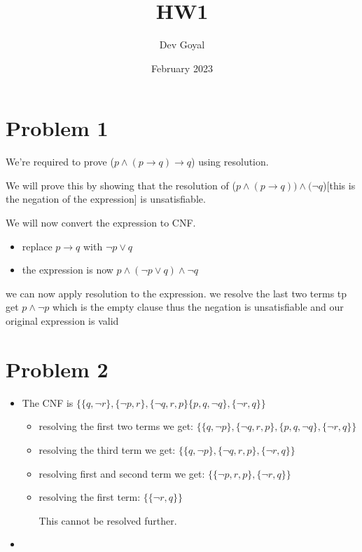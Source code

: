 \documentclass{article}
\title{HW1}
\author{Dev Goyal }
\date{February 2023}
\begin{document}
\maketitle

\section{Problem 1}

We're required to prove ($p \land (p \rightarrow q) \rightarrow q$) using resolution.

We will prove this by showing that the resolution of ($p \land (p \rightarrow q)) \land (\neg q$)[this is the negation of the expression] is unsatisfiable.

We will now convert the expression to CNF.

\begin{itemize}
    \item replace $p \rightarrow q $ with $\neg p \lor q$
    \item the expression is now $p \land (\neg p \lor q) \land \neg q$
\end{itemize}
we can now apply resolution to the expression. we resolve the last two terms tp get $p \land \neg p$ which is the empty clause thus the negation is unsatisfiable and our original expression is valid 

\section{Problem 2}
\begin{itemize}
    \item The CNF is $\{ \{ q, \neg r\}, \{ \neg p, r \},\{ \neg q, r, p\} \{p, q, \neg q \}, \{\neg r, q \}\}$
    \begin{itemize}
        \item resolving the first two terms we get: $\{ \{ q, \neg p\},\{ \neg q, r, p\}, \{p, q, \neg q \}, \{\neg r, q \} \} $
        \item resolving the third term we get: $\{ \{ q, \neg p\},\{ \neg q, r, p\}, \{\neg r, q \} \} $
        \item resolving first and second term we get: $\{ \{ \neg p, r, p\}, \{\neg r, q \} \} $
        \item resolving the first term: $\{ \{\neg r, q \} \} $
        
        This cannot be resolved further.
        
    \end{itemize}
    
    \item 
\end{itemize}
\end{document}
